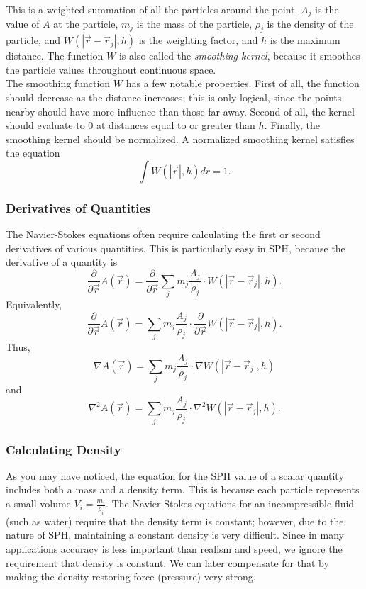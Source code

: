 \documentclass[a4paper]{article}
\begin{document}
This is a weighted summation of all the particles around the point. $A_j$ is the value of $A$ at the particle, $m_j$ is the mass of the particle, $\rho_j$ is the density of the particle, and $W(|\vec r - \vec r_j|, h)$ is the weighting factor, and $h$ is the maximum distance. The function $W$ is also called the \emph{smoothing kernel}, because it smoothes the particle values throughout continuous space. \\


    The smoothing function $W$ has a few notable properties. First of all, the function should decrease as the distance increases; this is only logical, since the points nearby should have more influence than those far away. Second of all, the kernel should evaluate to 0 at distances equal to or greater than $h$. Finally, the smoothing kernel should be normalized. A normalized smoothing kernel satisfies the equation
\[\int W(|\vec r|, h) dr = 1.\]

\subsubsection*{Derivatives of Quantities}
The Navier-Stokes equations often require calculating the first or second derivatives of various quantities. This is particularly easy in SPH, because the derivative of a quantity is
\[\frac{\partial}{\partial \vec r} A(\vec r) = \frac{\partial}{\partial \vec r} \sum_j m_j\frac{A_j}{\rho_j}\cdot W(|\vec r - \vec r_j|, h).\]
Equivalently,
\[\frac{\partial}{\partial \vec r} A(\vec r) = \sum_j m_j\frac{A_j}{\rho_j}\cdot \frac{\partial}{\partial \vec r} W(|\vec r - \vec r_j|, h).\]
Thus,
\[\nabla A(\vec r) = \sum_j m_j\frac{A_j}{\rho_j}\cdot \nabla W(|\vec r - \vec r_j|, h)\]
and
\[\nabla^2 A(\vec r) = \sum_j m_j\frac{A_j}{\rho_j}\cdot \nabla^2 W(|\vec r - \vec r_j|, h).\]

\subsubsection*{Calculating Density}
As you may have noticed, the equation for the SPH value of a scalar quantity includes both a mass and a density term. This is because each particle represents a small volume $V_i = \frac{m_i}{\rho_i}$. The Navier-Stokes equations for an incompressible fluid (such as water) require that the density term is constant; however, due to the nature of SPH, maintaining a constant density is very difficult. Since in many applications accuracy is less important than realism and speed, we ignore the requirement that density is constant. We can later compensate for that by making the density restoring force (pressure) very strong. \\
\end{document}
